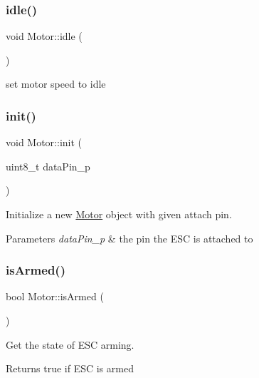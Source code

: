 \subsubsection{\texorpdfstring{idle()}{idle()}}
{\footnotesize\ttfamily void Motor\+::idle (\begin{DoxyParamCaption}{ }\end{DoxyParamCaption})}



set motor speed to idle 

\mbox{\label{class_motor_a62bf4d19aed7729c5dd4a2c1148c86f8}} 
\subsubsection{\texorpdfstring{init()}{init()}}
{\footnotesize\ttfamily void Motor\+::init (\begin{DoxyParamCaption}\item[{uint8\+\_\+t}]{data\+Pin\+\_\+p }\end{DoxyParamCaption})}



Initialize a new \hyperlink{class_motor}{Motor} object with given attach pin. 


\begin{DoxyParams}{Parameters}
{\em data\+Pin\+\_\+p} & the pin the E\+SC is attached to \\
\hline
\end{DoxyParams}
\mbox{\label{class_motor_a9f6e92bbf36d9f68665bc1e02af075b6}} 
\subsubsection{\texorpdfstring{is\+Armed()}{isArmed()}}
{\footnotesize\ttfamily bool Motor\+::is\+Armed (\begin{DoxyParamCaption}{ }\end{DoxyParamCaption})}



Get the state of E\+SC arming. 

\begin{DoxyReturn}{Returns}
true if E\+SC is armed 
\end{DoxyReturn}
\mbox{\label{class_motor_a0d852462f8afab5d980d2507d1915447}} 

